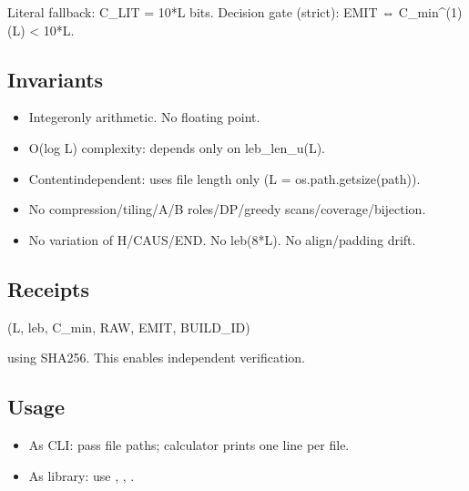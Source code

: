 \documentclass[letterpaper,10pt,english]{sphinxmanual}
\begin{document}
\sphinxAtStartPar
Literal fallback: C\_LIT = 10*L bits.
Decision gate (strict): EMIT ⇔ C\_min\textasciicircum{}(1)(L) \textless{} 10*L.


\subsection{Invariants}
\label{\detokenize{clf_maximal_validator:invariants}}\begin{itemize}
\item {} 
\sphinxAtStartPar
Integer\sphinxhyphen{}only arithmetic. No floating point.

\item {} 
\sphinxAtStartPar
O(log L) complexity: depends only on leb\_len\_u(L).

\item {} 
\sphinxAtStartPar
Content\sphinxhyphen{}independent: uses file length only (L = os.path.getsize(path)).

\item {} 
\sphinxAtStartPar
No compression/tiling/A/B roles/DP/greedy scans/coverage/bijection.

\item {} 
\sphinxAtStartPar
No variation of H/CAUS/END. No leb(8*L). No align/padding drift.

\end{itemize}


\subsection{Receipts}
\label{\detokenize{clf_maximal_validator:receipts}}\begin{description}
\sphinxAtStartPar
(L, leb, C\_min, RAW, EMIT, BUILD\_ID)

\end{description}

\sphinxAtStartPar
using SHA\sphinxhyphen{}256. This enables independent verification.


\subsection{Usage}
\label{\detokenize{clf_maximal_validator:usage}}\begin{itemize}
\item {} 
\sphinxAtStartPar
As CLI: pass file paths; calculator prints one line per file.

\item {} 
\sphinxAtStartPar
As library: use , , .

\end{itemize}
\end{document}
